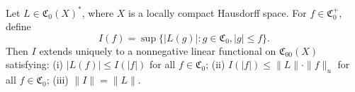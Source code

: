 Let $L \in \mathfrak{C}_0(X)^*$, where $X$ is a locally compact Hausdorff space. For $f \in \mathfrak{C}_0^+$, define
$$I(f) = \sup\{|L(g)| : g \in \mathfrak{C}_0, |g| \leq f\}.$$
Then $I$ extends uniquely to a nonnegative linear functional on $\mathfrak{C}_{00}(X)$ satisfying:
(i) $|L(f)| \leq I(|f|)$ for all $f \in \mathfrak{C}_0$;
(ii) $I(|f|) \leq \|L\| \cdot \|f\|_u$ for all $f \in \mathfrak{C}_0$;
(iii) $\|I\| = \|L\|$.
